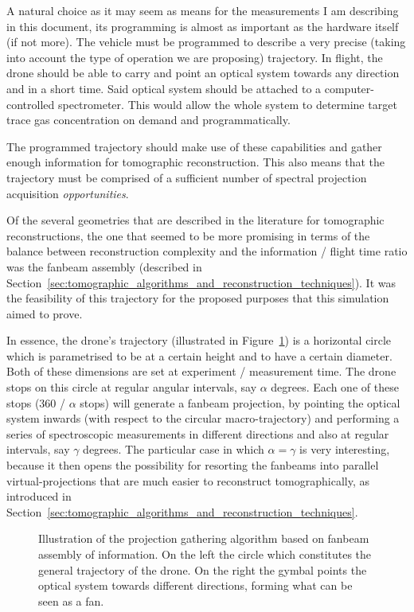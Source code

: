 A natural choice as it may seem as means for the measurements I am
describing in this document, its programming is almost  as important as
the hardware itself (if not more). The vehicle must be programmed to
describe a very precise (taking into account the type of operation we
are proposing) trajectory. In flight, the drone should be able to carry
and point an optical system towards any direction and in a short time.
Said optical system should be attached to a computer-controlled
spectrometer. This would allow the whole system to determine target
trace gas concentration on demand and programmatically.

The programmed trajectory should make use of these capabilities and
gather enough information for tomographic reconstruction. This also
means that the trajectory must be comprised of a sufficient number of
spectral projection acquisition \emph{opportunities}.

Of the several geometries that are described in the literature for
tomographic reconstructions, the one that seemed to be more promising in
terms of the balance between reconstruction complexity and the
information / flight time ratio was the fanbeam assembly (described in
Section~\ref{sec:tomographic_algorithms_and_reconstruction_techniques}).
It was the feasibility of this trajectory for the proposed purposes that
this simulation aimed to prove.

In essence, the drone's trajectory (illustrated in
Figure~\ref{fig:illustriated_trajectory_and_fanbeam_formation}) is a
horizontal circle which is parametrised to be at a certain height and to
have a certain diameter.  Both of these dimensions are set at experiment
/ measurement time. The drone stops on this circle at regular angular
intervals, say $\alpha$ degrees. Each one of these stops (360 / $\alpha$
stops) will generate a fanbeam projection, by pointing the optical
system inwards (with respect to the circular macro-trajectory) and
performing a series of spectroscopic measurements in different
directions and also at regular intervals, say $\gamma$ degrees. The
particular case in which $\alpha = \gamma$ is very interesting, because
it then opens the possibility for resorting the fanbeams into parallel
virtual-projections that are much easier to reconstruct tomographically,
as introduced in
Section~\ref{sec:tomographic_algorithms_and_reconstruction_techniques}.  

\begin{figure}[htpb]
    \centering
    \missingfigure{}
    \caption{Illustration of the projection gathering algorithm based on
    fanbeam assembly of information. On the left the circle which
    constitutes the general trajectory of the drone. On the right the
    gymbal points the optical system towards different directions, forming
    what can be seen as a fan.}
    \label{fig:illustriated_trajectory_and_fanbeam_formation}
\end{figure}

